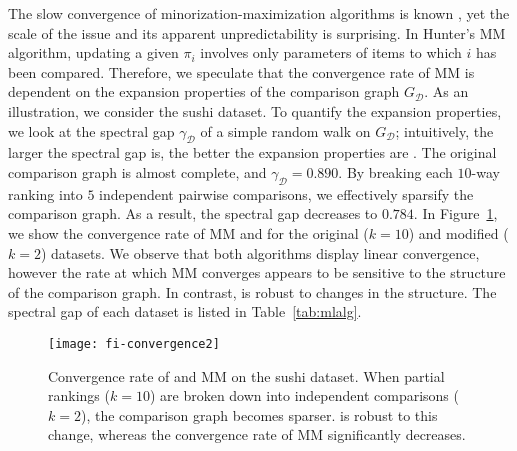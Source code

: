 The slow convergence of minorization-maximization algorithms is known \cite{hunter2004mm}, yet the scale of the issue and its apparent unpredictability is surprising.
In Hunter's MM algorithm, updating a given $\pi_i$ involves only parameters of items to which $i$ has been compared.
Therefore, we speculate that the convergence rate of MM is dependent on the expansion properties of the comparison graph $G_{\mathcal{D}}$.
As an illustration, we consider the sushi dataset.
To quantify the expansion properties, we look at the spectral gap $\gamma_{\mathcal{D}}$ of a simple random walk on $G_{\mathcal{D}}$;
intuitively, the larger the spectral gap is, the better the expansion properties are \citep{levin2008markov}.
The original comparison graph is almost complete, and $\gamma_{\mathcal{D}} = 0.890$.
By breaking each $10$-way ranking into $5$ independent pairwise comparisons, we effectively sparsify the comparison graph.
As a result, the spectral gap decreases to $0.784$.
In Figure~\ref{fig:convergence}, we show the convergence rate of MM and \ILSR{} for the original ($k = 10$) and modified ($k = 2$) datasets.
We observe that both algorithms display linear convergence, however the rate at which MM converges appears to be sensitive to the structure of the comparison graph.
In contrast, \ILSR{} is robust to changes in the structure.
The spectral gap of each dataset is listed in Table~\ref{tab:mlalg}.


\begin{figure}[ht]
\centering
\texttt{[image: fi-convergence2]}
\caption{
Convergence rate of \ILSR{} and MM on the sushi dataset.
When partial rankings ($k = 10$) are broken down into independent comparisons ($k = 2$), the comparison graph becomes sparser.
\ILSR{} is robust to this change, whereas the convergence rate of MM significantly decreases.
}
\label{fig:convergence}
\end{figure}


